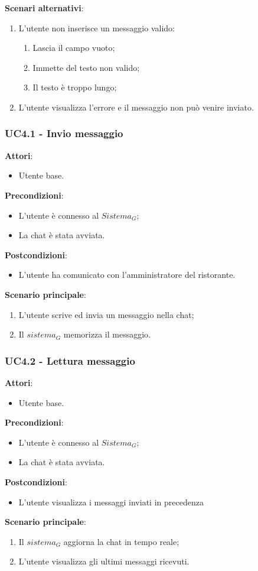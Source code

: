 \textbf{Scenari alternativi}:
\begin{enumerate}
    \item L'utente non inserisce un messaggio valido:
    \begin{enumerate}
        \item Lascia il campo vuoto;
        \item Immette del testo non valido;
        \item Il testo è troppo lungo;
    \end{enumerate}
    \item L'utente visualizza l'errore e il messaggio non può venire inviato.
\end{enumerate}
\subsubsection{UC4.1 - Invio messaggio}\label{usecase:4_1}
\textbf{Attori}:
\begin{itemize}
    \item Utente base.
\end{itemize}
\textbf{Precondizioni}:
\begin{itemize}
    \item L'utente è connesso al $\textit{Sistema}_G$;
     \item La chat è stata avviata.
\end{itemize}
\textbf{Postcondizioni}:
\begin{itemize}
    \item L'utente ha comunicato con l'amministratore del ristorante.
\end{itemize}
\textbf{Scenario principale}:
\begin{enumerate}
    \item L'utente scrive ed invia un messaggio nella chat;
    \item Il $\textit{sistema}_G$ memorizza il messaggio.
\end{enumerate}
\subsubsection{UC4.2 - Lettura messaggio}\label{usecase:4_2}
\textbf{Attori}:
\begin{itemize}
    \item Utente base.
\end{itemize}
\textbf{Precondizioni}:
\begin{itemize}
    \item L'utente è connesso al $\textit{Sistema}_G$;
    \item La chat è stata avviata.
\end{itemize}
\textbf{Postcondizioni}:
\begin{itemize}
    \item L'utente visualizza i messaggi inviati in precedenza
\end{itemize}
\textbf{Scenario principale}:
\begin{enumerate}
\item Il $\textit{sistema}_G$ aggiorna la chat in tempo reale;
\item L'utente visualizza gli ultimi messaggi ricevuti.
\end{enumerate}
\newpage